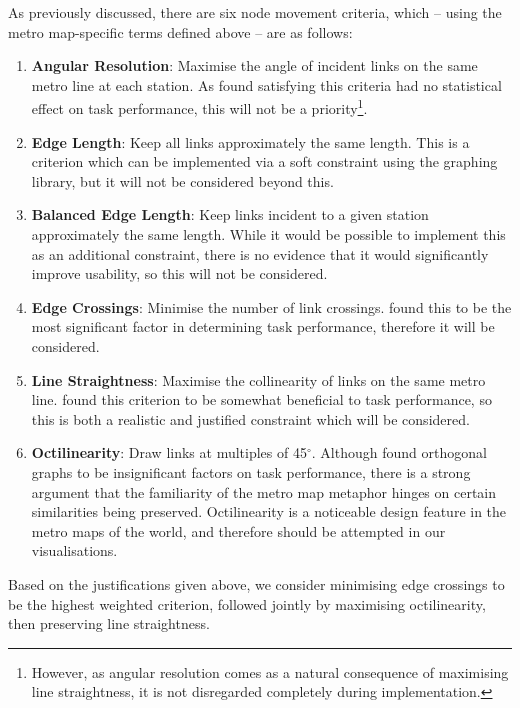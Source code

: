 As previously discussed, there are six node movement criteria, which -- using the metro map-specific terms defined above -- are as follows:
\begin{enumerate}
	\item\textbf{Angular Resolution}: Maximise the angle of incident links on the same metro line at each station. As \cite{WhichAesthetic} found satisfying this criteria had no statistical effect on task performance, this will not be a priority\footnote{However, as angular resolution comes as a natural consequence of maximising line straightness, it is not disregarded completely during implementation.}.
	
	\item\textbf{Edge Length}: Keep all links approximately the same length. This is a criterion which can be implemented via a soft constraint using the graphing library, but it will not be considered beyond this.
	
	\item\textbf{Balanced Edge Length}: Keep links incident to a given station approximately the same length. While it would be possible to implement this as an additional constraint, there is no evidence that it would significantly improve usability, so this will not be considered.
	
	\item\textbf{Edge Crossings}: Minimise the number of link crossings. \citeauthor{WhichAesthetic} found this to be the most significant factor in determining task performance, therefore it will be considered.
	
	\item\textbf{Line Straightness}: Maximise the collinearity of links on the same metro line. \citeauthor{WhichAesthetic} found this criterion to be somewhat beneficial to task performance, so this is both a realistic and justified constraint which will be considered. 
	
	\item\textbf{Octilinearity}: Draw links at multiples of 45$^{\circ}$. Although \citeauthor{WhichAesthetic} found orthogonal graphs to be insignificant factors on task performance, there is a strong argument that the familiarity of the metro map metaphor hinges on certain similarities being preserved. Octilinearity is a noticeable design feature in the metro maps of the world, and therefore should be attempted in our visualisations.
\end{enumerate}

Based on the justifications given above, we consider minimising edge crossings to be the highest weighted criterion, followed jointly by maximising octilinearity, then preserving line straightness.

